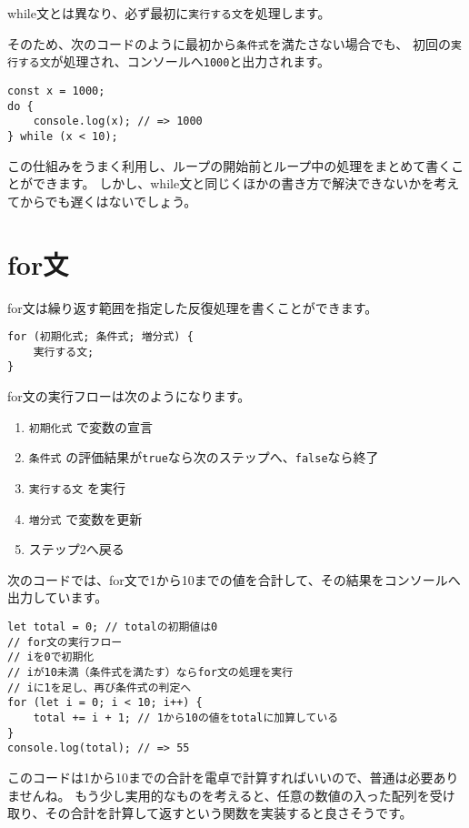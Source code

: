 while文とは異なり、必ず最初に\texttt{実行する文}を処理します。

そのため、次のコードのように最初から\texttt{条件式}を満たさない場合でも、
初回の\texttt{実行する文}が処理され、コンソールへ\texttt{1000}と出力されます。

\begin{lstlisting}
const x = 1000;
do {
    console.log(x); // => 1000
} while (x < 10);
\end{lstlisting}

この仕組みをうまく利用し、ループの開始前とループ中の処理をまとめて書くことができます。
しかし、while文と同じくほかの書き方で解決できないかを考えてからでも遅くはないでしょう。

\hypertarget{for-statement}{%
\section{for文}\label{for-statement}}

for文は繰り返す範囲を指定した反復処理を書くことができます。

\begin{lstlisting}
for (初期化式; 条件式; 増分式) {
    実行する文;
}
\end{lstlisting}

for文の実行フローは次のようになります。

\begin{enumerate}
\def\labelenumi{\arabic{enumi}.}
\item
  \texttt{初期化式} で変数の宣言
\item
  \texttt{条件式}
  の評価結果が\texttt{true}なら次のステップへ、\texttt{false}なら終了
\item
  \texttt{実行する文} を実行
\item
  \texttt{増分式} で変数を更新
\item
  ステップ2へ戻る
\end{enumerate}

次のコードでは、for文で1から10までの値を合計して、その結果をコンソールへ出力しています。

\begin{lstlisting}
let total = 0; // totalの初期値は0
// for文の実行フロー
// iを0で初期化
// iが10未満（条件式を満たす）ならfor文の処理を実行
// iに1を足し、再び条件式の判定へ
for (let i = 0; i < 10; i++) {
    total += i + 1; // 1から10の値をtotalに加算している
}
console.log(total); // => 55
\end{lstlisting}

このコードは1から10までの合計を電卓で計算すればいいので、普通は必要ありませんね。
もう少し実用的なものを考えると、任意の数値の入った配列を受け取り、その合計を計算して返すという関数を実装すると良さそうです。

